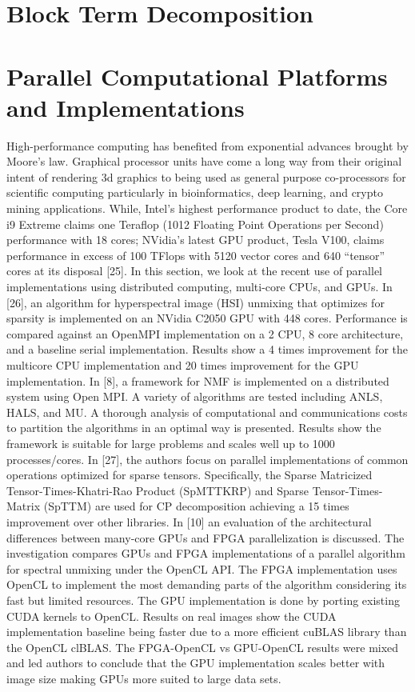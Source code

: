 \section{Block Term Decomposition}

\section{Parallel Computational Platforms and Implementations}
High-performance computing has benefited from exponential advances brought by Moore’s law.  Graphical processor units have come a long way from their original intent of rendering 3d graphics to being used as general purpose co-processors for scientific computing particularly in bioinformatics, deep learning, and crypto mining applications.  While, Intel’s highest performance product to date, the Core i9 Extreme claims one Teraflop (1012 Floating Point Operations per Second) performance with 18 cores; NVidia’s latest GPU product, Tesla V100, claims performance in excess of 100 TFlops with 5120 vector cores and 640 “tensor” cores at its disposal [25].  In this section, we look at the recent use of parallel implementations using distributed computing, multi-core CPUs, and GPUs.
In [26], an algorithm for hyperspectral image (HSI) unmixing that optimizes for sparsity is implemented on an NVidia C2050 GPU with 448 cores.  Performance is compared against an OpenMPI implementation on a 2 CPU, 8 core architecture, and a baseline serial implementation.  Results show a 4 times improvement for the multicore CPU implementation and 20 times improvement for the GPU implementation.
In [8], a framework for NMF is implemented on a distributed system using Open MPI.  A variety of algorithms are tested including ANLS, HALS, and MU.  A thorough analysis of computational and communications costs to partition the algorithms in an optimal way is presented.  Results show the framework is suitable for large problems and scales well up to 1000 processes/cores.
In [27], the authors focus on parallel implementations of common operations optimized for sparse tensors.  Specifically, the Sparse Matricized Tensor-Times-Khatri-Rao Product (SpMTTKRP) and Sparse Tensor-Times-Matrix (SpTTM) are used for CP decomposition achieving a 15 times improvement over other libraries.
In [10] an evaluation of the architectural differences between many-core GPUs and FPGA parallelization is discussed.  The investigation compares GPUs and FPGA implementations of a parallel algorithm for spectral unmixing under the OpenCL API.  The FPGA implementation uses OpenCL to implement the most demanding parts of the algorithm considering its fast but limited resources.  The GPU implementation is done by porting existing CUDA kernels to OpenCL.  Results on real images show the CUDA implementation baseline being faster due to a more efficient cuBLAS library than the OpenCL clBLAS.  The FPGA-OpenCL vs GPU-OpenCL results were mixed and led authors to conclude that the GPU implementation scales better with image size making GPUs more suited to large data sets.

